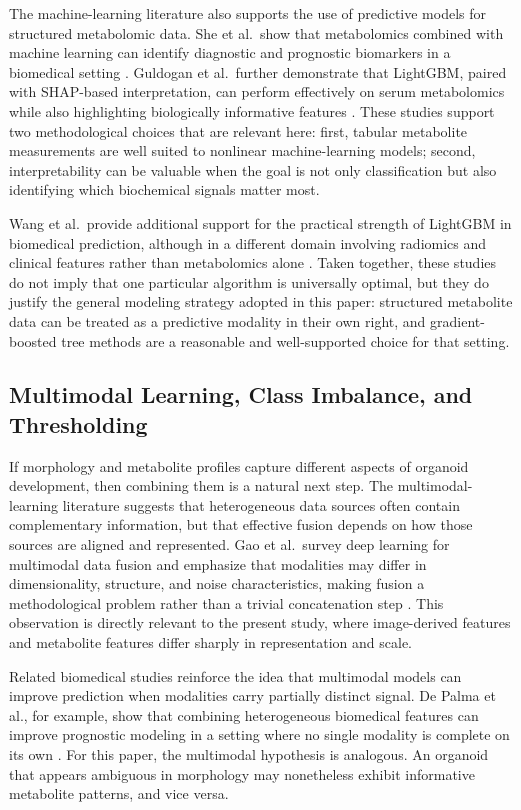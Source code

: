 \documentclass{article}
\begin{document}
The machine-learning literature also supports the use of predictive models for structured metabolomic data. She et al.\ show that metabolomics combined with machine learning can identify diagnostic and prognostic biomarkers in a biomedical setting \cite{she2023}. Guldogan et al.\ further demonstrate that LightGBM, paired with SHAP-based interpretation, can perform effectively on serum metabolomics while also highlighting biologically informative features \cite{guldogan2025}. These studies support two methodological choices that are relevant here: first, tabular metabolite measurements are well suited to nonlinear machine-learning models; second, interpretability can be valuable when the goal is not only classification but also identifying which biochemical signals matter most.

Wang et al.\ provide additional support for the practical strength of LightGBM in biomedical prediction, although in a different domain involving radiomics and clinical features rather than metabolomics alone \cite{wang2024}. Taken together, these studies do not imply that one particular algorithm is universally optimal, but they do justify the general modeling strategy adopted in this paper: structured metabolite data can be treated as a predictive modality in their own right, and gradient-boosted tree methods are a reasonable and well-supported choice for that setting.

\subsection{Multimodal Learning, Class Imbalance, and Thresholding}

If morphology and metabolite profiles capture different aspects of organoid development, then combining them is a natural next step. The multimodal-learning literature suggests that heterogeneous data sources often contain complementary information, but that effective fusion depends on how those sources are aligned and represented. Gao et al.\ survey deep learning for multimodal data fusion and emphasize that modalities may differ in dimensionality, structure, and noise characteristics, making fusion a methodological problem rather than a trivial concatenation step \cite{gao2020}. This observation is directly relevant to the present study, where image-derived features and metabolite features differ sharply in representation and scale.

Related biomedical studies reinforce the idea that multimodal models can improve prediction when modalities carry partially distinct signal. De Palma et al., for example, show that combining heterogeneous biomedical features can improve prognostic modeling in a setting where no single modality is complete on its own \cite{depalma2026}. For this paper, the multimodal hypothesis is analogous. An organoid that appears ambiguous in morphology may nonetheless exhibit informative metabolite patterns, and vice versa.
\end{document}
